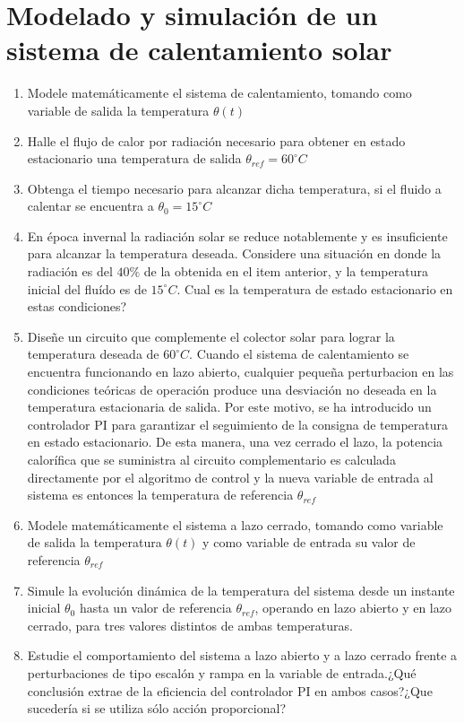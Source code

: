 \section{Modelado y simulación de un sistema de calentamiento solar}
\begin{enumerate}
   \item Modele matemáticamente el sistema de calentamiento, tomando como variable
         de salida la temperatura $\theta(t)$\label{item_2_1}
   \item Halle el flujo de calor por radiación necesario para obtener en estado
         estacionario una temperatura de salida $\theta_{ref}=60^{\circ}C$\label{item_2_2}
   \item Obtenga el tiempo necesario para alcanzar dicha temperatura, si el
         fluido a calentar se encuentra a $\theta_{0}=15^{\circ}C$\label{item_2_3}
   \item En época invernal la radiación solar se reduce notablemente y es
         insuficiente para alcanzar la temperatura deseada. Considere una situación en donde la
         radiación es del $40\%$ de la obtenida en el item anterior, y la temperatura inicial del
         fluído es de $15^{\circ}C$. Cual es la temperatura de estado estacionario en estas
         condiciones?\label{item_2_4}
   \item Diseñe un circuito que complemente el colector solar para lograr la temperatura deseada
         de $60^{\circ}C$. Cuando el sistema de calentamiento se encuentra funcionando en lazo
         abierto, cualquier pequeña perturbacion en las condiciones teóricas de operación produce
         una desviación no deseada en la temperatura estacionaria de salida. Por este motivo,
         se ha introducido un controlador PI para garantizar el seguimiento de la consigna de
         temperatura en estado estacionario. De esta manera, una vez cerrado el lazo, la potencia
         calorífica que se suministra al circuito complementario es calculada directamente por el
         algoritmo de control y la nueva variable de entrada al sistema es entonces la temperatura
         de referencia $\theta_{ref}$\label{item_2_5}
   \item Modele matemáticamente el sistema a lazo cerrado, tomando como variable de salida la
         temperatura $\theta(t)$ y como variable de entrada su valor de referencia $\theta_{ref}$\label{item_2_6}
   \item Simule la evolución dinámica de la temperatura del sistema desde un instante inicial
         $\theta_{0}$ hasta un valor de referencia $\theta_{ref}$, operando en lazo abierto y
         en lazo cerrado, para tres valores distintos de ambas temperaturas.\label{item_2_7}
   \item Estudie el comportamiento del sistema a lazo abierto y a lazo cerrado frente a
         perturbaciones de tipo escalón y rampa en la variable de entrada.¿Qué conclusión extrae
         de la eficiencia del controlador PI en ambos casos?¿Que sucedería si se utiliza sólo
         acción proporcional?\label{item_2_8}
\end{enumerate}

